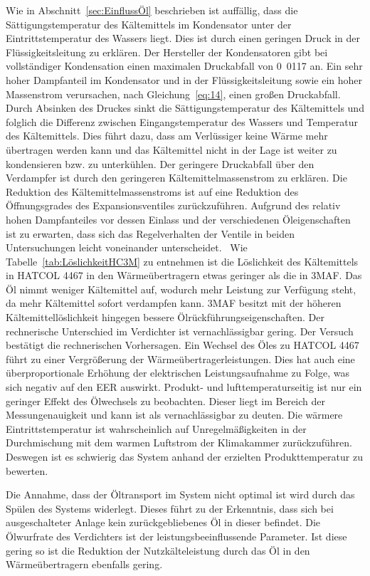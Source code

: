 Wie in Abschnitt~\ref{sec:EinflussÖl} beschrieben ist auffällig, dass die Sättigungstemperatur des Kältemittels im Kondensator unter der Eintrittstemperatur des Wassers liegt. Dies ist durch einen geringen Druck in der Flüssigkeitsleitung zu erklären. Der Hersteller der Kondensatoren gibt bei vollständiger Kondensation einen maximalen Druckabfall von \unit{0.0117}{\bbar} an. Ein sehr hoher Dampfanteil im Kondensator und in der Flüssigkeitsleitung sowie ein hoher Massenstrom verursachen, nach Gleichung~\ref{eq:14}, einen großen Druckabfall. Durch Absinken des Druckes sinkt die Sättigungstemperatur des Kältemittels und folglich die Differenz zwischen Eingangstemperatur des Wassers und Temperatur des Kältemittels. Dies führt dazu, dass am Verlüssiger keine Wärme mehr übertragen werden kann und das Kältemittel nicht in der Lage ist weiter zu kondensieren bzw. zu unterkühlen. Der geringere Druckabfall über den Verdampfer ist durch den geringeren Kältemittelmassenstrom zu erklären. Die Reduktion des Kältemittelmassenstroms ist auf eine Reduktion des Öffnungsgrades des Expansionsventiles zurückzuführen. Aufgrund des relativ hohen Dampfanteiles vor dessen Einlass und der verschiedenen Öleigenschaften ist zu erwarten, dass sich das Regelverhalten der Ventile in beiden Untersuchungen leicht voneinander unterscheidet.  \
Wie Tabelle~\ref{tab:LöslichkeitHC3M} zu entnehmen ist die Löslichkeit des Kältemittels in HATCOL 4467 in den Wärmeübertragern etwas geringer als die in 3MAF. Das Öl nimmt weniger Kältemittel auf, wodurch mehr Leistung zur Verfügung steht, da mehr Kältemittel sofort verdampfen kann. 3MAF besitzt mit der höheren Kältemittellöslichkeit hingegen bessere Ölrückführungseigenschaften. Der rechnerische Unterschied im Verdichter ist vernachlässigbar gering.
Der Versuch bestätigt die rechnerischen Vorhersagen. Ein Wechsel des Öles zu HATCOL 4467 führt zu einer Vergrößerung der Wärmeübertragerleistungen. Dies hat auch eine überproportionale Erhöhung der elektrischen Leistungsaufnahme zu Folge, was sich negativ auf den EER auswirkt.
Produkt- und lufttemperaturseitig ist nur ein geringer Effekt des Ölwechsels zu beobachten. Dieser liegt im Bereich der Messungenauigkeit und kann ist als vernachlässigbar zu deuten. Die wärmere Eintrittstemperatur ist wahrscheinlich auf Unregelmäßigkeiten in der Durchmischung mit dem warmen Luftstrom der Klimakammer zurückzuführen. Deswegen ist es schwierig das System anhand der erzielten Produkttemperatur zu bewerten.

Die Annahme, dass der Öltransport im System nicht optimal ist wird durch das Spülen des Systems widerlegt. Dieses führt zu der Erkenntnis, dass sich bei ausgeschalteter Anlage kein zurückgebliebenes Öl in dieser befindet. Die Ölwurfrate des Verdichters ist der leistungsbeeinflussende Parameter. Ist diese gering so ist die Reduktion der Nutzkälteleistung durch das Öl in den Wärmeübertragern ebenfalls gering. 

